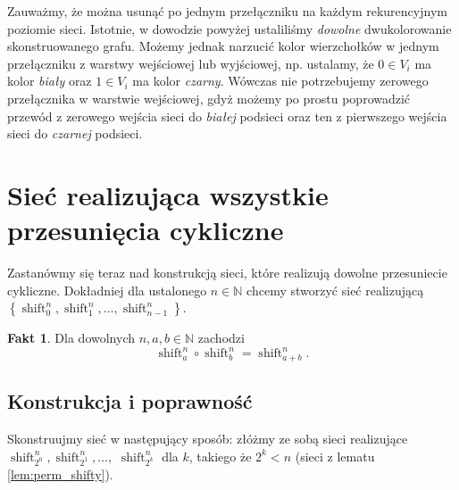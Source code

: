 \documentclass[a4paper]{article}
\newcommand{\shift}[2]{\operatorname{shift}_{#2}^{#1}}
\newcommand{\td}{\text{.}}
\newcommand{\N}{\mathbb{N}}
\newcommand{\lt}{\left}
\newcommand{\rt}{\right}
\theoremstyle{definition}
\newtheorem{fa}[tw]{Fakt}
\begin{document}
Zauważmy, że można usunąć po jednym przełączniku na każdym rekurencyjnym poziomie sieci. Istotnie, w dowodzie powyżej ustaliliśmy \emph{dowolne} dwukolorowanie skonstruowanego grafu. Możemy jednak narzucić kolor wierzchołków w jednym przełączniku z warstwy wejściowej lub wyjściowej, np. ustalamy, że \(0 \in V_i\) ma kolor \emph{biały} oraz \(1 \in V_i\) ma kolor \emph{czarny}. Wówczas nie potrzebujemy zerowego przełącznika w warstwie wejściowej, gdyż możemy po prostu poprowadzić przewód z zerowego wejścia sieci do \emph{białej} podsieci oraz ten z pierwszego wejścia sieci do \emph{czarnej} podsieci. 


\section{Sieć realizująca wszystkie przesunięcia cykliczne}

Zastanówmy się teraz nad konstrukcją sieci, które realizują dowolne przesuniecie cykliczne. Dokładniej dla ustalonego \(n \in \N\) chcemy stworzyć sieć realizującą \(\lt\{ \shift n 0, \shift n 1, \ldots, \shift n {n-1} \rt\}\).

\begin{fa}\label{fa:zlozenie_shift}
    Dla dowolnych \(n, a, b \in \N\) zachodzi
    \[
    \shift n a \circ \shift n b = \shift n {a+b} \td
    \]
\end{fa}

\subsection{Konstrukcja i poprawność}

Skonstruujmy sieć w następujący sposób: złóżmy ze sobą sieci realizujące \({\shift n {2^0}, \shift n {2^1}, \ldots,}\) \(\shift n {2^k}\) dla \(k\), takiego że \(2^k < n\) (sieci z lematu \ref{lem:perm_shifty}). 
\end{document}
